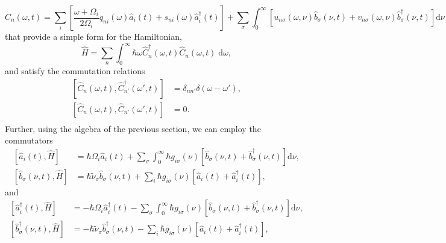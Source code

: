 \begin{equation}\label{eq:hybridOperatorDefinition}
\hat{C}_n(\omega,t) = \sum_i\left[\frac{\omega + \Omega_i}{2\Omega_i}q_{ni}(\omega)\hat{a}_i(t) + s_{ni}(\omega)\hat{a}^\dagger_i(t)\right] + \sum_\sigma\int_0^\infty\left[u_{n\sigma}(\omega,\nu)\hat{b}_\sigma(\nu,t) + v_{n\sigma}(\omega,\nu)\hat{b}_\sigma^\dagger(\nu,t)\right]\mathrm{d}\nu
\end{equation}
that provide a simple form for the Hamiltonian,
\begin{equation}\label{eq:HdiagManyModes}
\hat{H} = \sum_n\int_0^\infty\hbar\omega\hat{C}_n^\dagger(\omega,t)\hat{C}_n(\omega,t)\;\mathrm{d}\omega,
\end{equation}
and satisfy the commutation relations
\begin{equation}\label{eq:hybridOperatorCommutatorManyModes}
\begin{split}
\left[\hat{C}_n(\omega,t),\hat{C}_{n'}^\dagger(\omega',t)\right] &= \delta_{nn'}\delta(\omega - \omega'),\\
\left[\hat{C}_n(\omega,t),\hat{C}_{n'}(\omega',t)\right] &= 0.\\
\end{split}
\end{equation}
Further, using the algebra of the previous section, we can employ the commutators
\begin{equation}
\begin{split}
\left[\hat{a}_i(t),\hat{H}\right] &= \hbar\Omega_i\hat{a}_i(t) + \sum_\sigma\int_0^\infty\hbar g_{i\sigma}(\nu)\left[\hat{b}_\sigma(\nu,t) + \hat{b}_\sigma^\dagger(\nu,t)\right]\mathrm{d}\nu,\\
\left[\hat{b}_\sigma(\nu,t),\hat{H}\right] &= \hbar\tilde{\nu}_\sigma\hat{b}_\sigma(\nu,t) + \sum_i\hbar g_{i\sigma}(\nu)\left[\hat{a}_i(t) + \hat{a}_i^\dagger(t)\right],
\end{split}
\end{equation}
and
\begin{equation}
\begin{split}
\left[\hat{a}_i^\dagger(t),\hat{H}\right] &= -\hbar\Omega_i\hat{a}_i^\dagger(t) - \sum_\sigma\int_0^\infty\hbar g_{i\sigma}(\nu)\left[\hat{b}_\sigma(\nu,t) + \hat{b}_\sigma^\dagger(\nu,t)\right]\mathrm{d}\nu,\\
\left[\hat{b}_\sigma^\dagger(\nu,t),\hat{H}\right] &= -\hbar\tilde{\nu}_\sigma\hat{b}_\sigma^\dagger(\nu,t) - \sum_i\hbar g_{i\sigma}(\nu)\left[\hat{a}_i(t) + \hat{a}_i^\dagger(t)\right],
\end{split}
\end{equation}
